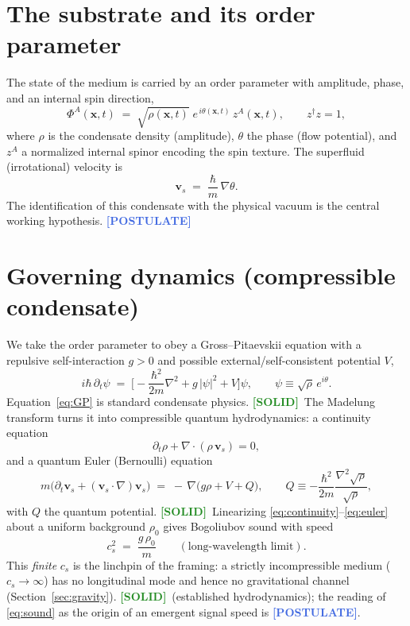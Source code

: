\documentclass[11pt]{article}
\newcommand{\SOLID}{\textcolor{ForestGreen}{\textbf{[SOLID]}}}
\newcommand{\POSTULATE}{\textcolor{RoyalBlue}{\textbf{[POSTULATE]}}}
\begin{document}
\section{The substrate and its order parameter}
The state of the medium is carried by an order parameter with amplitude, phase,
and an internal spin direction,
\begin{equation}
  \Phi^{A}(\mathbf{x},t) \;=\; \sqrt{\rho(\mathbf{x},t)}\;
    e^{\,i\theta(\mathbf{x},t)}\, z^{A}(\mathbf{x},t),
  \qquad z^{\dagger} z = 1 ,
\end{equation}
where $\rho$ is the condensate density (amplitude), $\theta$ the phase (flow
potential), and $z^{A}$ a normalized internal spinor encoding the spin texture.
The superfluid (irrotational) velocity is
\begin{equation}
  \mathbf{v}_s \;=\; \frac{\hbar}{m}\,\nabla\theta .
\end{equation}
The identification of this condensate with the physical vacuum is the central
working hypothesis. \POSTULATE

\section{Governing dynamics (compressible condensate)}
\label{sec:dynamics}
We take the order parameter to obey a Gross--Pitaevskii equation with a
repulsive self-interaction $g>0$ and possible external/self-consistent potential
$V$,
\begin{equation}
  i\hbar\,\partial_t \psi \;=\;
    \Big[-\frac{\hbar^{2}}{2m}\nabla^{2} + g\,|\psi|^{2} + V\Big]\psi ,
  \qquad \psi \equiv \sqrt{\rho}\,e^{i\theta}.
  \label{eq:GP}
\end{equation}
Equation~\eqref{eq:GP} is standard condensate physics. \SOLID\ The Madelung
transform turns it into compressible quantum hydrodynamics: a continuity
equation
\begin{equation}
  \partial_t \rho + \nabla\!\cdot(\rho\,\mathbf{v}_s) = 0 ,
  \label{eq:continuity}
\end{equation}
and a quantum Euler (Bernoulli) equation
\begin{equation}
  m\big(\partial_t \mathbf{v}_s + (\mathbf{v}_s\!\cdot\!\nabla)\mathbf{v}_s\big)
  \;=\; -\,\nabla\!\big(g\rho + V + Q\big),
  \qquad
  Q \equiv -\frac{\hbar^{2}}{2m}\frac{\nabla^{2}\sqrt{\rho}}{\sqrt{\rho}} ,
  \label{eq:euler}
\end{equation}
with $Q$ the quantum potential. \SOLID\ Linearizing
\eqref{eq:continuity}--\eqref{eq:euler} about a uniform background $\rho_0$ gives
Bogoliubov sound with speed
\begin{equation}
  c_s^{2} \;=\; \frac{g\,\rho_0}{m}
  \qquad (\text{long-wavelength limit}).
  \label{eq:sound}
\end{equation}
This \emph{finite} $c_s$ is the linchpin of the framing: a strictly
incompressible medium ($c_s\!\to\!\infty$) has no longitudinal mode and hence no
gravitational channel (Section~\ref{sec:gravity}). \SOLID\ (established
hydrodynamics); the reading of \eqref{eq:sound} as the origin of an emergent
signal speed is \POSTULATE.
\end{document}
